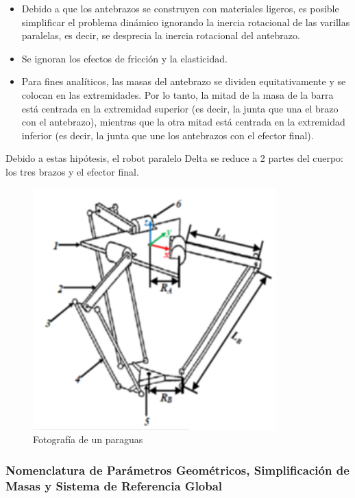         \begin{itemize}
            \item Debido a que los antebrazos se construyen con materiales ligeros, es posible simplificar el problema dinámico ignorando la inercia rotacional de las varillas paralelas, es decir, se desprecia la inercia rotacional del antebrazo.
            \item Se ignoran los efectos de fricción y la elasticidad.
            \item Para fines analíticos, las masas del antebrazo se dividen equitativamente y se colocan en las extremidades. Por lo tanto, la mitad de la masa de la barra está centrada en la extremidad superior (es decir, la junta que una el brazo con el antebrazo), mientras que la otra mitad está centrada en la extremidad inferior (es decir, la junta que une los antebrazos con el efector final).
        \end{itemize}

        Debido a estas hipótesis, el robot paralelo Delta se reduce a 2 partes del cuerpo: los tres brazos y el efector final.
     
        \begin{figure}[H]
              \centering
	          \includegraphics[width=0.6\linewidth]{Main/Chapter4/Images4/cap4_dina_b_1.png}
              \caption{Fotografía de un paraguas}
              \label{f:Cap4_Metodo_B_Modelacion_Dinamica_1}
        \end{figure}
        
                \newpage

        \subsubsection{Nomenclatura de Parámetros Geométricos, Simplificación de Masas y Sistema de Referencia Global }


